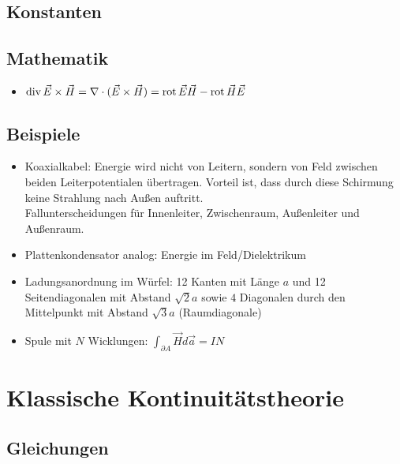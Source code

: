 \documentclass[english]{latex4ei/latex4ei_sheet}
\begin{document}
\subsection*{Konstanten}
\subsection*{Mathematik}
\begin{itemize}
	\item $\operatorname{div}{\vec{E} \times \vec{H}}=\nabla \cdot (\vec{E} \times \vec{H})=\operatorname{rot}{\vec{E}}\vec{H}-\operatorname{rot}{\vec{H}}\vec{E}$
\end{itemize}
\subsection*{Beispiele}
\begin{itemize}
	\item Koaxialkabel: Energie wird nicht von Leitern, sondern von Feld zwischen beiden Leiterpotentialen \"ubertragen. Vorteil ist, dass durch diese Schirmung keine Strahlung nach Au\ss{}en auftritt.\\
	Fallunterscheidungen f\"ur Innenleiter, Zwischenraum, Au\ss{}enleiter und Au\ss{}enraum.
\item Plattenkondensator analog: Energie im Feld/Dielektrikum
\item Ladungsanordnung im W\"urfel: 12 Kanten mit L\"ange $a$ und 12 Seitendiagonalen mit Abstand $\sqrt{2}a$ sowie $4$ Diagonalen durch den Mittelpunkt mit Abstand $\sqrt{3}a$ (Raumdiagonale)
\item Spule mit $N$ Wicklungen: $\int_{\partial A} \vec{H} d \vec{a}= I N$
\end{itemize}
\section{Klassische Kontinuit\"atstheorie}
\subsection{Gleichungen}
\end{document}
